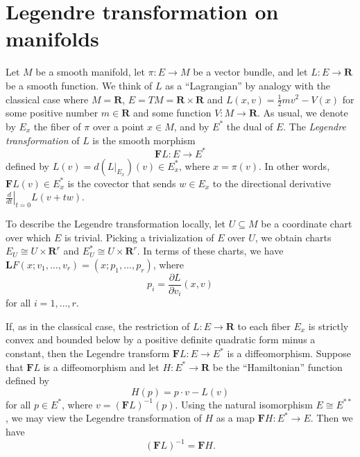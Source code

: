 \documentclass{article}
\providecommand{\R}{\mathbf R}
\providecommand{\F}{\mathbf F}
\begin{document}
\section*{Legendre transformation on manifolds}

Let $M$ be a smooth manifold, let $\pi : E\to M$ be a vector bundle, and let $L : E\to \R$ be a smooth function.
We think of $L$ as a ``Lagrangian'' by analogy with the classical case where $M = \R$, $E = TM = \R\times \R$ and $L(x,v) = \frac 1 2 m v^2 - V(x)$ for some positive number $m\in \R$ and some function $V : M \to \R$.
As usual, we denote by $E_x$ the fiber of $\pi$ over a point $x\in M$, and by $E^*$ the dual of $E$.
The \emph{Legendre transformation} of $L$ is the smooth morphism
$$\F L : E \to E^*$$
defined by 
$L(v) = d(L|_{E_x})(v) \in E_x^*$,
where $x = \pi(v)$.
In other words, $\F L(v)\in E_x^*$ is the covector that sends $w\in E_x$ to the directional derivative $\left.\frac d {dt}\right|_{t=0} L(v + tw)$.

To describe the Legendre transformation locally, let $U\subseteq M$ be a coordinate chart over which $E$ is trivial.
Picking a trivialization of $E$ over $U$, we obtain charts $E_U \cong U \times \R^r$ and $E_U^* \cong U \times \R^r$.
In terms of these charts, we have $\mathbf L F(x; v_1,\dotsc, v_r) = (x; p_1,\dotsc, p_r)$, where
$$p_i = \frac {\partial L}{\partial v_i}(x,v)$$
for all $i=1,\dots, r$.

If, as in the classical case, the restriction of $L : E\to \R$ to each fiber $E_x$ is strictly convex and bounded below by a positive definite quadratic form minus a constant, then the Legendre transform $\F L : E\to E^*$ is a diffeomorphism.
Suppose that $\F L$ is a diffeomorphism and let $H : E^* \to \R$ be the ``Hamiltonian'' function defined by
$$H(p) = p \cdot v - L(v)$$
for all $p\in E^*$, where $v = (\F L)^{-1}(p)$.
Using the natural isomorphism $E\cong E^{**}$, we may view the Legendre transformation of $H$ as a map $\F H : E^* \to E$.
Then we have
$$(\F L)^{-1} = \F H.$$
\end{document}
